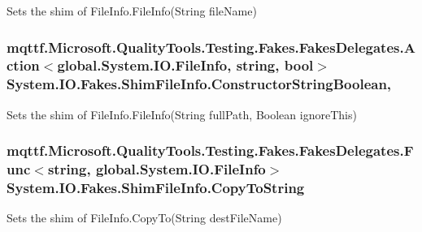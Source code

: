Sets the shim of File\-Info.\-File\-Info(\-String file\-Name)

\hypertarget{class_system_1_1_i_o_1_1_fakes_1_1_shim_file_info_abed68548929c4307685f6ec1f94b0878}{
\subsubsection[{Constructor\-String\-Boolean}]{\setlength{\rightskip}{0pt plus 5cm}mqttf.\-Microsoft.\-Quality\-Tools.\-Testing.\-Fakes.\-Fakes\-Delegates.\-Action$<$global.\-System.\-I\-O.\-File\-Info, string, bool$>$ System.\-I\-O.\-Fakes.\-Shim\-File\-Info.\-Constructor\-String\-Boolean\hspace{0.3cm}{\ttfamily [static]}, {\ttfamily [set]}}}\label{class_system_1_1_i_o_1_1_fakes_1_1_shim_file_info_abed68548929c4307685f6ec1f94b0878}


Sets the shim of File\-Info.\-File\-Info(\-String full\-Path, Boolean ignore\-This)

\hypertarget{class_system_1_1_i_o_1_1_fakes_1_1_shim_file_info_aa8ca4876aae5bd005c5fee2badc4c0c2}{
\subsubsection[{Copy\-To\-String}]{\setlength{\rightskip}{0pt plus 5cm}mqttf.\-Microsoft.\-Quality\-Tools.\-Testing.\-Fakes.\-Fakes\-Delegates.\-Func$<$string, global.\-System.\-I\-O.\-File\-Info$>$ System.\-I\-O.\-Fakes.\-Shim\-File\-Info.\-Copy\-To\-String\hspace{0.3cm}{\ttfamily [set]}}}\label{class_system_1_1_i_o_1_1_fakes_1_1_shim_file_info_aa8ca4876aae5bd005c5fee2badc4c0c2}


Sets the shim of File\-Info.\-Copy\-To(\-String dest\-File\-Name)

